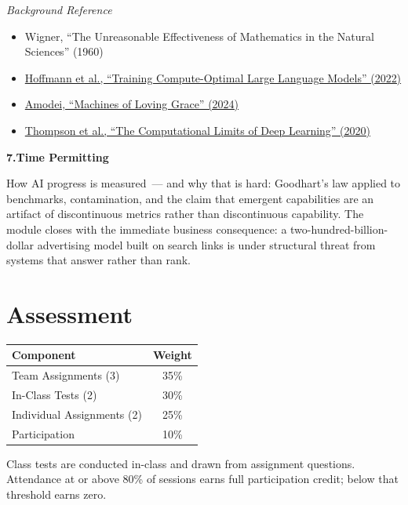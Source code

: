 \documentclass[11pt]{article}
\newcommand{\module}[2]{%
  \vspace{10pt}%
  {\large\textbf{#1\quad #2}}%
  \vspace{4pt}%
  \newline%
}
\begin{document}
\textit{Background Reference}
\begin{itemize}
  \item Wigner, ``The Unreasonable Effectiveness of Mathematics in the Natural Sciences'' (1960)
  \item \href{https://arxiv.org/abs/2203.15556}{Hoffmann et al., ``Training Compute-Optimal Large Language Models'' (2022)}
  \item \href{https://darioamodei.com/machines-of-loving-grace}{Amodei, ``Machines of Loving Grace'' (2024)}
  \item \href{https://arxiv.org/abs/2007.05558}{Thompson et al., ``The Computational Limits of Deep Learning'' (2020)}
\end{itemize}

\bigskip

\module{7.}{Time Permitting}

How AI progress is measured~--- and why that is hard: Goodhart's law applied to benchmarks, contamination, and the claim that emergent capabilities are an artifact of discontinuous metrics rather than discontinuous capability. The module closes with the immediate business consequence: a two-hundred-billion-dollar advertising model built on search links is under structural threat from systems that answer rather than rank.


\section*{Assessment}

\begin{center}
\renewcommand{\arraystretch}{1.35}
\begin{tabular}{lc}
  \toprule
  \textbf{Component} & \textbf{Weight} \\
  \midrule
  Team Assignments (3)       & 35\% \\
  In-Class Tests (2)         & 30\% \\
  Individual Assignments (2) & 25\% \\
  Participation              & 10\% \\
  \bottomrule
\end{tabular}
\end{center}

\medskip
Class tests are conducted in-class and drawn from assignment questions. Attendance at or above 80\% of sessions earns full participation credit; below that threshold earns zero.
\end{document}
